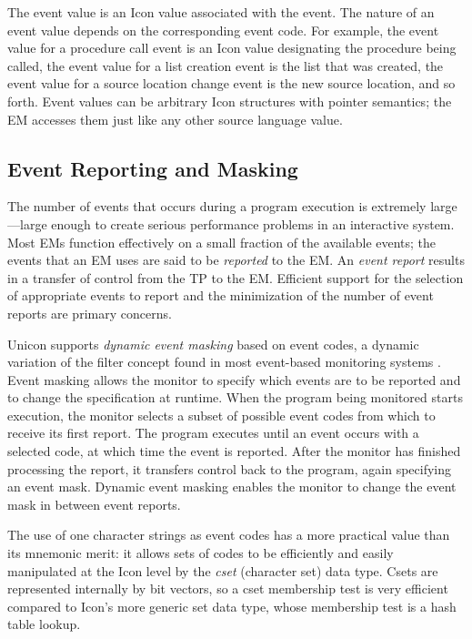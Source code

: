 The event value is an Icon value associated with the event.  The
nature of an event value depends on the corresponding event code.
For example, the event value for a procedure call event is an
Icon value designating the procedure being called, the event value for
a list creation event is the list that was created, the event value
for a source location change event is the new source location, and so
forth.  Event values can be arbitrary Icon structures with pointer
semantics; the EM accesses them just like any other source language
value.

\subsection*{Event Reporting and Masking}

The number of events that occurs during a program execution is
extremely large---large enough to create serious performance problems
in an interactive system.  Most EMs function effectively on a
small fraction of the available events; the events that an EM uses
are said to be {\em reported\/} to the EM.  An {\em event report\/}
results in a transfer of control from the TP to the EM.  Efficient
support for the selection of appropriate events to report and the
minimization of the number of event reports are primary concerns.

Unicon supports {\em dynamic event masking\/} based on event codes,
a dynamic variation of the filter concept found in most event-based
monitoring systems
\cite{Bates89} \cite{Elshoff89}.
Event masking allows the monitor to specify which
events are to be reported and to change the specification at runtime.
When the program being monitored starts execution, the monitor selects
a subset of possible event codes from which to receive its first
report.  The program executes until an event occurs with a selected
code, at which time the event is reported.  After the monitor has
finished processing the report, it transfers control back to the
program, again specifying an event mask.  Dynamic event masking
enables the monitor to change the event mask in between event reports.

The use of one character strings as event codes has a more practical
value than its mnemonic merit: it allows sets of codes to be
efficiently and easily manipulated at the Icon level by the {\em cset\/}
(character set) data type.  Csets are represented internally by bit
vectors, so a cset membership test is very efficient compared to
Icon's more generic set data type, whose membership test is a hash
table lookup.

